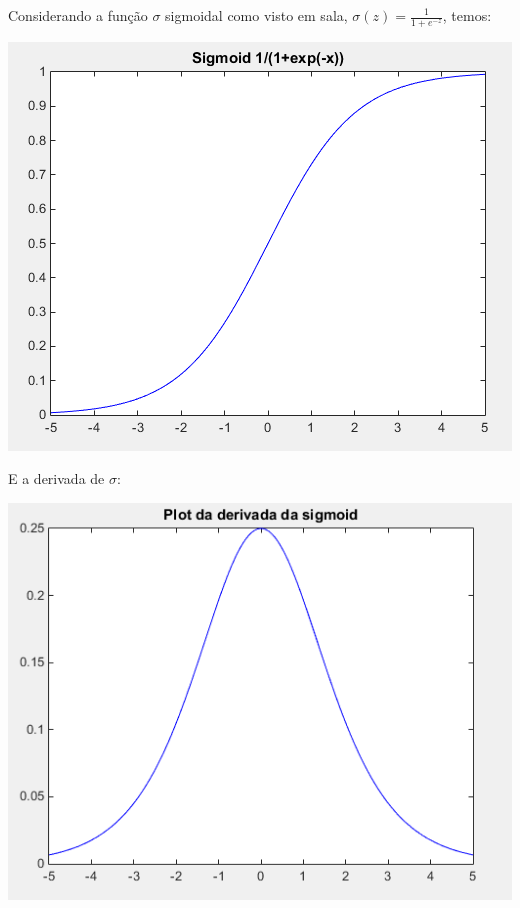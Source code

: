 \documentclass[
	12pt,				%
	oneside,			%
	a4paper,			%
	english,			%
	french,				%
	spanish,			%
	brazil,				%
	]{abntex2}
\begin{document}
Considerando a fun\c{c}\~ao $\sigma$ sigmoidal como visto em sala, $\sigma(z) = \frac{1}{1 + e^{-z}}$, temos:

\begin{center}
	\includegraphics[scale=0.8]{plotsig.png}
\end{center}

E a derivada de $\sigma$:

\begin{center}
	\includegraphics[scale=0.8]{plotderiv.png}
\end{center}
\end{document}
